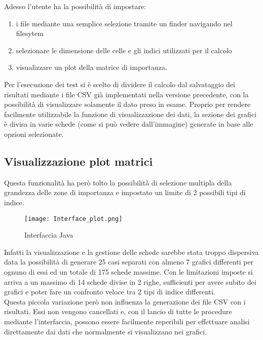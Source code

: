 Adesso l'utente ha la possibilit\`a di impostare:
\begin{enumerate}
    \item i file mediante una semplice selezione tramite un finder navigando nel filesytem
    \item selezionare le dimensione delle celle e gli indici utilizzati per il calcolo
    \item visualizzare un plot della matrice di importanza.
\end{enumerate}
Per l'esecuzione dei test si \`e scelto di dividere il calcolo dal salvataggio dei risultati mediante i file CSV
gi\`a implementati nella versione precedente, con la possibilit\`a di visualizzare solamente il dato preso in esame.
Proprio per rendere facilmente utilizzabile la funzione di visualizzazione dei dati, la sezione dei grafici \`e
divisa in varie schede (come si pu\`o vedere dall'immagine) generate in base alle opzioni selezionate.

\subsection{Visualizzazione plot matrici}
Questa funzionalit\`a ha per\`o tolto la possibilit\`a di selezione multipla della grandezza delle zone di importanza
e impostato un limite di 2 possibili tipi di indice.

\begin{figure}[h]
    \begin{center}
    \texttt{[image: Interface\_plot.png]}
    \caption[IntJava]{Interfaccia Java}
    \label{etichetta}
    \end{center}
\end{figure}

Infatti la visualizzazione e la gestione delle schede sarebbe stata troppo dispersiva data la possibilit\`a di
generare 25 casi separati con almeno 7 grafici differenti per ognuno di essi ed un totale di 175 schede massime.
Con le limitazioni imposte si arriva a un massimo di 14 schede divise in 2 righe, sufficienti per avere subito
dei grafici e poter fare un confronto veloce tra 2 tipi di indice differenti.\\
Questa piccola variazione per\`o non influenza la generazione dei file CSV con i risultati. Essi non vengono cancellati
e, con il lancio di tutte le procedure mediante l'interfaccia, possono essere facilmente reperibili per effettuare
analisi direttamente dai dati che normalmente si visualizzano nei grafici.
